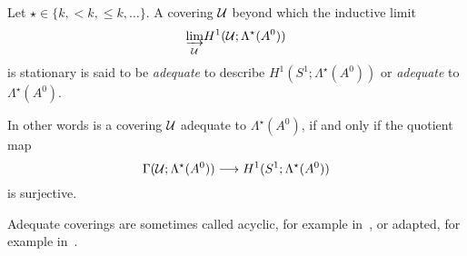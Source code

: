 \begin{defn}
  Let $\star\in\{k,<k,\leq k,\dots\}$.
  A covering $\mathcal{U}$ beyond which the inductive limit
  \[
    \underset{\mathcal{U}}{\underrightarrow{\lim}}H^1(\mathcal{U};\Lambda^\star(A^0))
  \]
  is stationary is said to be \emph{adequate} to describe
  $H^1(S^1;\Lambda^\star(A^0))$ or \emph{adequate} to $\Lambda^\star(A^0)$.
  \begin{comment}
    A covering $\cU$ is said to be \emph{adequate} to describe
    $H^1(S^1;\Lambda^\star(A^0))$ or \emph{adequate} to $\Lambda^\star(A^0)$ if
    for every element in
    $\underset{\cU}{\underrightarrow{\lim}}H^1(\cU;\Lambda^\star(A^0))$
    given by some covering $\cU'$ and an element of
    $\Gamma(\cU';\Lambda^\star(A^0))$
    there exists
    \begin{itemize}
      \item an element in $\Gamma(\cU;\Lambda^\star(A^0))$ and
      \item an common refinement of $\cU$ and $\cU'$
    \end{itemize}
    such that \PROBLEM[the elements are~?? on the refined covering.]
  \end{comment}

  In other words is a covering $\mathcal{U}$ adequate to $\Lambda^\star(A^0)$, if and
  only if the quotient map
  \[
      \Gamma(\mathcal{U};\Lambda^\star(A^0))\longrightarrow H^1(S^1;\Lambda^\star(A^0))
  \]
  is surjective.
  \begin{comment}
    \cite[371]{Martinet1991} introduces the following definition
    \begin{s-defn}
      A covering $\cU$ is \emph{adapted} if every anti-Stokes direction is
      contained in exactly one element of the nerve $\dot\cU$.
    \end{s-defn}
  \end{comment}
\end{defn}
Adequate coverings are sometimes called acyclic, for example
in~\cite{Loday2004}, or adapted, for example in~\cite{Martinet1991}.

